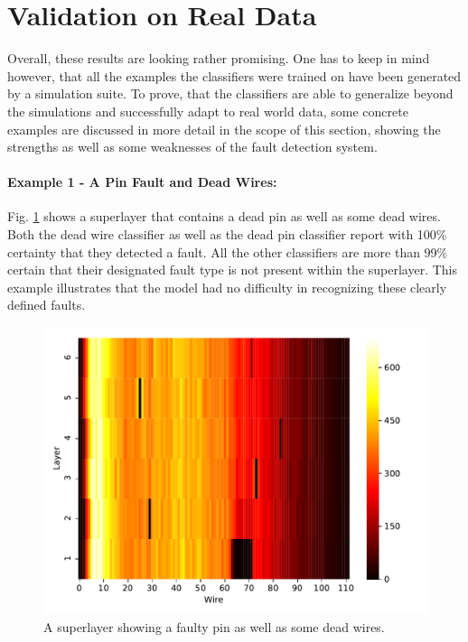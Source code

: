 \section{Validation on Real Data}

Overall, these results are looking rather promising. One has to keep in mind
however, that all the examples the classifiers were trained on have
been generated by a simulation suite. To prove, that the classifiers
are able to generalize beyond the simulations and successfully adapt
to real world data, some concrete examples are discussed in more
detail in the scope of this section, showing the strengths as well as
some weaknesses of the fault detection system.

\paragraph{Example 1 - A Pin Fault and Dead Wires:}

Fig. \ref{fig:pin-success} shows a superlayer that contains a dead pin
as well as some dead wires.  Both the dead wire classifier as well as
the dead pin classifier report with 100\% certainty that they detected
a fault. All the other classifiers are more than 99\% certain that
their designated fault type is not present within the
superlayer. This example illustrates that the model had no difficulty
in recognizing these clearly defined faults.

\begin{figure}
  \includegraphics[width=\textwidth]{../figures/small_pin_success}
  \caption{A superlayer showing a faulty pin as well as some dead
    wires.}
  \label{fig:pin-success}
\end{figure}

